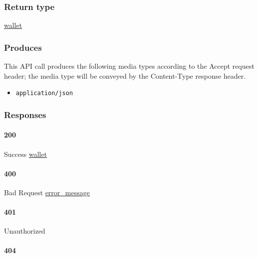 \hypertarget{return-type-71}{%
\subsubsection{Return type}\label{return-type-71}}

\protect\hyperlink{wallet}{wallet}

\hypertarget{produces-87}{%
\subsubsection{Produces}\label{produces-87}}

This API call produces the following media types according to the
{Accept} request header; the media type will be conveyed by the
{Content-Type} response header.

\begin{itemize}
\tightlist
\item
  \texttt{application/json}
\end{itemize}

\hypertarget{responses-89}{%
\subsubsection{Responses}\label{responses-89}}

\hypertarget{section-290}{%
\paragraph{200}\label{section-290}}

Success \protect\hyperlink{wallet}{wallet}

\hypertarget{section-291}{%
\paragraph{400}\label{section-291}}

Bad Request \protect\hyperlink{error_message}{error\_message}

\hypertarget{section-292}{%
\paragraph{401}\label{section-292}}

Unauthorized \protect\hyperlink{}{}

\hypertarget{section-293}{%
\paragraph{404}\label{section-293}}

